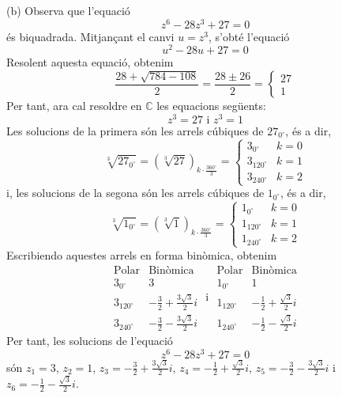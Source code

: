 \begin{solucio}
(b) Observa que l’equació
\[
z^{6}-28z^{3}+27=0
\]
és biquadrada. Mitjançant el canvi $u=z^{3}$, s’obté l’equació
\[
u^{2}-28u+27=0
\]
Resolent aquesta equació, obtenim
\[
\frac{28+\sqrt{784-108}}{2}=\frac{28\pm 26}{2}=\left\{
\begin{array}{l}
27 \\
1
\end{array}
\right.
\]
Per tant, ara cal resoldre en $\mathbb{C}$ les equacions següents:
\[
z^{3}=27\text{ \ \ \ i \ \ \ }z^{3}=1
\]
Les solucions de la primera són les arrels cúbiques de $27_{0
^{\circ}
}$, és a dir,
\[
\sqrt[3]{27_{0
^{\circ}
}}=\left( \sqrt[3]{27}\right) _{k\cdot \frac{360
^{\circ}
}{3}}=\left\{
\begin{array}{ll}
3_{0
^{\circ}
} & k=0 \\
3_{120
^{\circ}
} & k=1 \\
3_{240
^{\circ}
} & k=2
\end{array}
\right.
\]
i, les solucions de la segona són les arrels cúbiques de $1_{0
^{\circ}
}$, és a dir,
\[
\sqrt[3]{1_{0
^{\circ}
}}=\left( \sqrt[3]{1}\right) _{k\cdot \frac{360
^{\circ}
}{3}}=\left\{
\begin{array}{ll}
1_{0
^{\circ}
} & k=0 \\
1_{120
^{\circ}
} & k=1 \\
1_{240
^{\circ}
} & k=2
\end{array}
\right.
\]
Escribiendo aquestes arrels en forma binòmica, obtenim
\[
\begin{array}{ll}
\text{Polar} & \text{Binòmica} \\
3_{0
^{\circ}
} & 3 \\
3_{120
^{\circ}
} & -\frac{3}{2}+\frac{3\sqrt{3}}{2}i \\
3_{240
^{\circ}
} & -\frac{3}{2}-\frac{3\sqrt{3}}{2}i
\end{array}
\text{ \ \ i \ \ }
\begin{array}{ll}
\text{Polar} & \text{Binòmica} \\
1_{0
^{\circ}
} & 1 \\
1_{120
^{\circ}
} & -\frac{1}{2}+\frac{\sqrt{3}}{2}i \\
1_{240
^{\circ}
} & -\frac{1}{2}-\frac{\sqrt{3}}{2}i
\end{array}
\]
Per tant, les solucions de l’equació
\[
z^{6}-28z^{3}+27=0
\]
són $z_{1}=3$, $z_{2}=1$, $z_{3}=-\frac{3}{2}+\frac{3\sqrt{3}}{2}i$, $z_{4}=-
\frac{1}{2}+\frac{\sqrt{3}}{2}i$, $z_{5}=-\frac{3}{2}-\frac{3\sqrt{3}}{2}i$
i $z_{6}=-\frac{1}{2}-\frac{\sqrt{3}}{2}i$.
\end{solucio}

